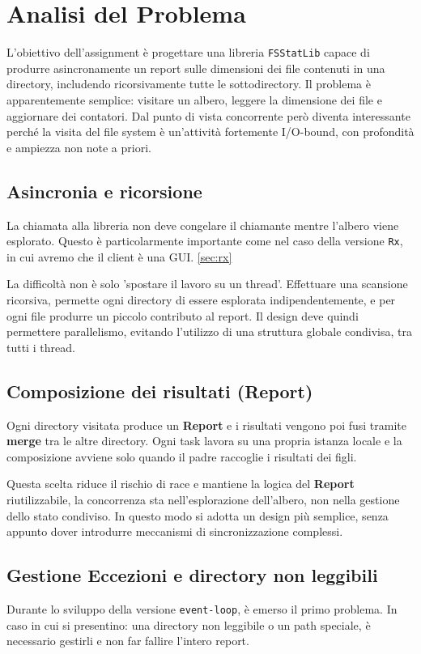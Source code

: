 \section{Analisi del Problema}
L'obiettivo dell'assignment è progettare una libreria \texttt{FSStatLib} capace di produrre asincronamente un report sulle dimensioni dei file contenuti in una directory, includendo ricorsivamente tutte le sottodirectory. Il problema è apparentemente semplice: visitare un albero, leggere la dimensione dei file e aggiornare dei contatori. Dal punto di vista concorrente però diventa interessante perché la visita del file system è un'attività fortemente I/O-bound, con profondità e ampiezza non note a priori.

\subsection{Asincronia e ricorsione}
La chiamata alla libreria non deve congelare il chiamante mentre l'albero viene esplorato. Questo è particolarmente importante come nel caso della versione \texttt{Rx}, in cui avremo che il client è una GUI. \ref{sec:rx}

La difficoltà non è solo 'spostare il lavoro su un thread'. Effettuare una scansione ricorsiva, permette ogni directory di essere esplorata indipendentemente, e per ogni file produrre un piccolo contributo al report. Il design deve quindi permettere parallelismo, evitando l'utilizzo di una struttura globale condivisa, tra tutti i thread.

\subsection{Composizione dei risultati (Report)}
Ogni directory visitata produce un \textbf{Report} e i risultati vengono poi fusi tramite \textbf{merge} tra le altre directory. 
Ogni task lavora su una propria istanza locale e la composizione avviene solo quando il padre raccoglie i risultati dei figli.

Questa scelta riduce il rischio di race e mantiene la logica del \textbf{Report} riutilizzabile, la concorrenza sta nell'esplorazione dell'albero, non nella gestione dello stato condiviso. In questo modo si adotta un design più semplice, senza appunto dover introdurre meccanismi di sincronizzazione complessi.

\subsection{Gestione Eccezioni e directory non leggibili}
\label{sec:else}
Durante lo sviluppo della versione \texttt{event-loop}, è emerso il primo problema. In caso in cui si presentino: una directory non leggibile o un path speciale, è necessario gestirli e non far fallire l'intero report.

